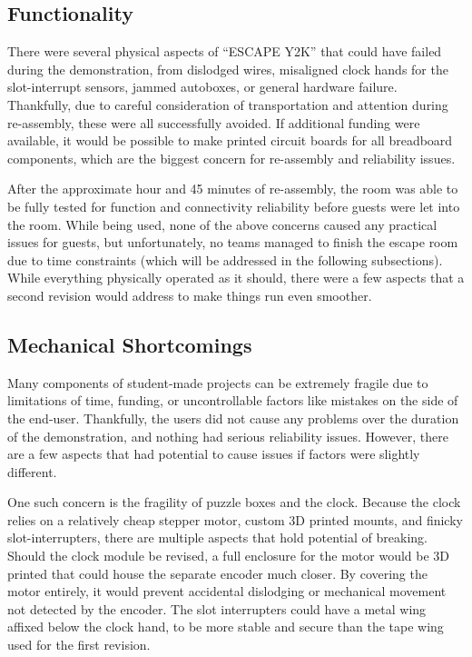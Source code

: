 \documentclass[conference]{IEEEtran}
\begin{document}
\subsection{Functionality}
There were several physical aspects of ``ESCAPE Y2K'' that could have failed during the demonstration, from dislodged wires, 
misaligned clock hands for the slot-interrupt sensors, jammed autoboxes, or general hardware failure. Thankfully, due 
to careful consideration of transportation and attention during re-assembly, these were all successfully avoided. If 
additional funding were available, it would be possible to make printed circuit boards for all breadboard components, 
which are the biggest concern for re-assembly and reliability issues.

\indent After the approximate hour and 45 minutes of re-assembly, the room was able to be fully tested for function 
and connectivity reliability before guests were let into the room. While being used, none of the above concerns caused 
any practical issues for guests, but unfortunately, no teams managed to finish the escape room due to time constraints 
(which will be addressed in the following subsections). While everything physically operated as it should, there were a 
few aspects that a second revision would address to make things run even smoother.

\subsection{Mechanical Shortcomings}
Many components of student-made projects can be extremely fragile due to limitations of time, funding, or uncontrollable 
factors like mistakes on the side of the end-user. Thankfully, the users did not cause any problems over the duration of 
the demonstration, and nothing had serious reliability issues. However, there are a few aspects that had potential to cause 
issues if factors were slightly different.

\indent One such concern is the fragility of puzzle boxes and the clock. Because the clock relies on a relatively cheap 
stepper motor, custom 3D printed mounts, and finicky slot-interrupters, there are multiple aspects that hold potential 
of breaking. Should the clock module be revised, a full enclosure for the motor would be 3D printed that could house the 
separate encoder much closer. By covering the motor entirely, it would prevent accidental dislodging or mechanical 
movement not detected by the encoder. The slot interrupters could have a metal wing affixed below the clock hand, to be 
more stable and secure than the tape wing used for the first revision. 
\end{document}
